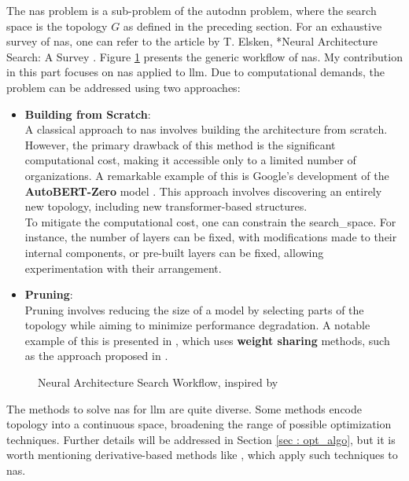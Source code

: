 The \acrshort{nas} problem is a sub-problem of the \acrshort{autodnn} problem, where the search space is the topology \( G \) as defined in the preceding section. For an exhaustive survey of \acrshort{nas}, one can refer to the article by T. Elsken, *Neural Architecture Search: A Survey \cite{elsken_neural_2019}. Figure \ref{fig:nas} presents the generic workflow of \acrshort{nas}. My contribution in this part focuses on \acrshort{nas} applied to \acrshort{llm}. Due to computational demands, the problem can be addressed using two approaches:

\begin{itemize}
    

    \item \textbf{Building from Scratch}:\\
    A classical approach to \acrshort{nas} involves building the architecture from scratch. However, the primary drawback of this method is the significant computational cost, making it accessible only to a limited number of organizations. A remarkable example of this is Google's development of the \textbf{AutoBERT-Zero} model \cite{gao_autobert-zero_2022}. This approach involves discovering an entirely new topology, including new transformer-based structures.\\
    To mitigate the computational cost, one can constrain the \gls{search_space}. For instance, the number of layers can be fixed, with modifications made to their internal components, or pre-built layers can be fixed, allowing experimentation with their arrangement.

    \item \textbf{Pruning}:\\
    Pruning involves reducing the size of a model by selecting parts of the topology while aiming to minimize performance degradation. A notable example of this is presented in \cite{klein_structural_2023}, which uses \textbf{weight sharing} methods, such as the approach proposed in \cite{pham_efficient_2018}.
\end{itemize}

\begin{figure}
    \centering
    
    \caption{Neural Architecture Search Workflow, inspired by \cite{elsken_neural_2019}}
    \label{fig:nas}
\end{figure}

The methods to solve \acrshort{nas} for \acrshort{llm} are quite diverse. Some methods encode topology into a continuous space, broadening the range of possible optimization techniques. Further details will be addressed in Section \ref{sec : opt_algo}, but it is worth mentioning derivative-based methods like \cite{liu_darts_2019}, which apply such techniques to \acrshort{nas}.

